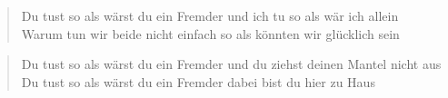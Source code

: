 \documentclass[9pt,a4paper,oneside, onecolumn]{article}
\begin{document}
\begin{verse}

Du \Gm{}tust so als wärst du ein \Dm{}Fremder und ich \C{}tu so als wär ich al\Dm{}lein\\
Wa\Gm{}rum tun wir beide nicht \Dm{}einfach so als \A{}könnten wir glücklich \Dm{}sein\\

\end{verse}
\begin{verse}

Du \Gm{}tust so als wärst du ein \Dm{}Fremder und du \C{}ziehst deinen Mantel nicht \Dm{}aus\\
Du \Gm{}tust so als wärst du ein \Dm{}Fremder da\A{}bei bist du hier zu \Dm{}Haus\\

\end{verse}
\end{document}
